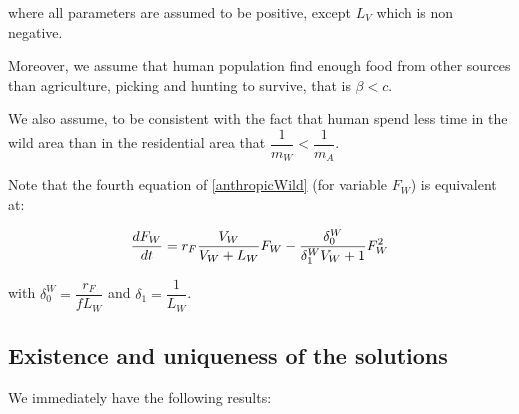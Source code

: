 \documentclass{article}
\begin{document}
where all parameters are assumed to be positive, except $L_V$ which is non negative.

Moreover, we assume that human population find enough food from other sources than agriculture, picking and hunting to survive, that is $\beta < c$.

We also assume, to be consistent with the fact that human spend less time in the wild area than in the residential area that $\dfrac{1}{m_W} < \dfrac{1}{m_A}$.


Note that the fourth equation of \eqref{anthropicWild} (for variable $F_W$) is equivalent at:

\begin{equation*}
\dfrac{dF_W}{dt} = r_F \dfrac{V_W}{V_W + L_W} F_W - \dfrac{\delta_0^W}{\delta_1^W V_W + 1} F_W^2 \\
\end{equation*}

with $\delta_0^W = \dfrac{r_F}{f L_W}$ and $\delta_1 = \dfrac{1}{L_W}$.

%

\subsection{Existence and uniqueness of the solutions}
We immediately have the following results:
\end{document}
